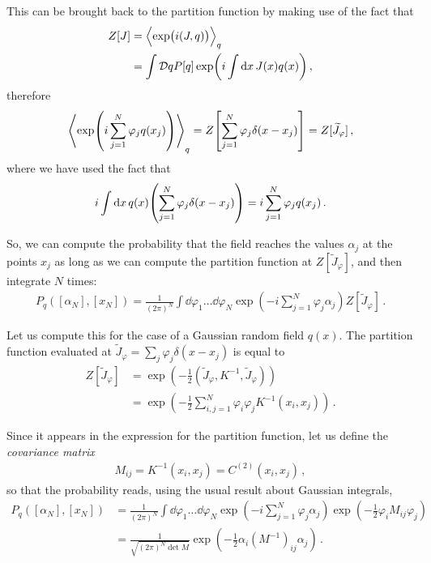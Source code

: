 \documentclass[main.tex]{subfiles}
\begin{document}
This can be brought back to the partition function by making use of the fact that 
%
\begin{align}
Z[J] &= \expval{\exp(i (J, q))}_q  \\
&= \int \mathcal{D}q P[q] \exp( i \int \dd{x} J(x) q(x))
\,,
\end{align}
%
therefore 
%
\begin{align}
\expval{\exp(i \sum _{j=1}^{N}\varphi _j q(x_j))}_q
= Z \qty[ \sum _{j=1}^{N} \varphi _j \delta (x - x_j)] 
= Z[ \widetilde{J}_\varphi ]
\,,
\end{align}
%
where we have used the fact that 
%
\begin{align}
i \int \dd{x} q(x) \qty(\sum _{j=1}^{N} \varphi _j \delta (x-x_j))
= i \sum _{j=1}^{N} \varphi_j q(x_j) 
\,.
\end{align}

So, we can compute the probability that the field reaches the values \(\alpha _j\) at the points \(x_j\) as long as we can compute the partition function at \(Z[\widetilde{J}_\varphi ]\), and then integrate \(N\) times: 
%
\begin{align}
P_q ([\alpha _N], [x_N]) = \frac{1}{(2 \pi)^{N}} 
\int \dd{\varphi_1 } \dots \dd{\varphi _N }
\exp(-i \sum _{j=1}^{N} \varphi _j \alpha_j )
Z[\widetilde{J}_\varphi ]
\,.
\end{align}

Let us compute this for the case of a Gaussian random field \(q(x)\). The partition function evaluated at \(\widetilde{J}_\varphi = \sum _{j} \varphi _j \delta (x- x_j)\) is equal to 
%
\begin{align}
Z[\widetilde{J}_\varphi ] &= \exp( - \frac{1}{2} (\widetilde{J}_\varphi , K^{-1}, \widetilde{J}_\varphi )) \\
&= \exp( - \frac{1}{2} \sum _{i, j =1}^{N} \varphi _i \varphi _j K^{-1} (x_i, x_j))
\,.
\end{align}

Since it appears in the expression for the partition function, let us define the \emph{covariance matrix}
%
\begin{align}
M_{ij} = K^{-1}(x_i, x_j) = C^{(2)} (x_i, x_j)
\,,
\end{align}
%
so that the probability reads, using the usual result about Gaussian integrals,
%
\begin{align}
P_q ([\alpha _N], [x_N]) &= \frac{1}{(2 \pi)^{N}} 
\int \dd{\varphi_1 } \dots \dd{\varphi _N }
\exp(-i \sum _{j=1}^{N} \varphi _j \alpha_j )
\exp(- \frac{1}{2} \varphi_i M_{ij } \varphi _j)  \\
&= \frac{1}{\sqrt{(2 \pi)^{N} \det M}}
\exp(- \frac{1}{2} \alpha _i (M^{-1})_{ij} \alpha _j)
\,.
\end{align}
\end{document}

